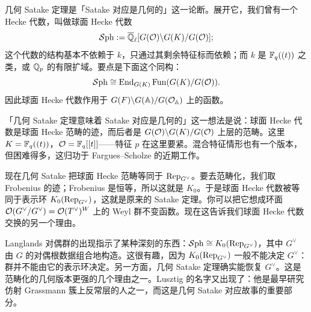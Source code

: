 几何 Satake 定理是「Satake 对应是几何的」这一论断。展开它，我们曾有一个 Hecke 代数，叫做球面 Hecke 代数
\[
\mathcal{S}\mathrm{ph}:=\overline{\mathbb{Q}}_\ell[G(\mathcal{O})\backslash G(K)/G(\mathcal{O})];
\]
这个代数的结构基本不依赖于 $k$，只通过其剩余特征标而依赖；而 $k$ 是 $\mathbb{F}_q((t))$ 之类，或 $\mathbb{Q}_p$ 的有限扩域。要点是下面这个同构：
\[
\mathcal{S}\mathrm{ph}\cong\operatorname{End}_{G(K)}\mathrm{Fun}(G(K)/G(\mathcal{O})).
\]
因此球面 Hecke 代数作用于 $G(F)\backslash G(\mathbb{A})/G(\mathcal{O}_{\mathbb{A}})$ 上的函数。

「几何 Satake 定理意味着 Satake 对应是几何的」这一想法是说：球面 Hecke 代数是球面 Hecke 范畴的迹，而后者是 $G(\mathcal{O})\backslash G(K)/G(\mathcal{O})$ 上层的范畴。这里 $K=\mathbb{F}_q((t))$，$\mathcal{O}=\mathbb{F}_q[[t]]$——特征 $p$ 在这里要紧。混合特征情形也有一个版本，但困难得多，这归功于 Fargues–Scholze 的近期工作。

现在几何 Satake 把球面 Hecke 范畴等同于 $\operatorname{Rep}_{G^\vee}$。要去范畴化，我们取 Frobenius 的迹；Frobenius 是恒等，所以这就是 $K_0$。于是球面 Hecke 代数被等同于表示环 $K_0(\operatorname{Rep}_{G^\vee})$，这就是原来的 Satake 定理。你可以把它想成环面 $\mathcal{O}(G^\vee/G^\vee)=\mathcal{O}(T^\vee)^W$ 上的 Weyl 群不变函数。现在这告诉我们球面 Hecke 代数交换的另一个理由。

Langlands 对偶群的出现指示了某种深刻的东西：$\mathcal{S}\mathrm{ph}\cong K_0(\operatorname{Rep}_{G^\vee})$，其中 $G^\vee$ 由 $G$ 的对偶根数据组合地构造。这很有趣，因为 $K_0(\operatorname{Rep}_{G^\vee})$ 一般不能决定 $G^\vee$：群并不能由它的表示环决定。另一方面，几何 Satake 定理确实能恢复 $G^\vee$。这是范畴化的几何版本更强的几个理由之一。Lusztig 的名字又出现了：他是最早研究仿射 Grassmann 簇上反常层的人之一，而这是几何 Satake 对应故事的重要部分。

